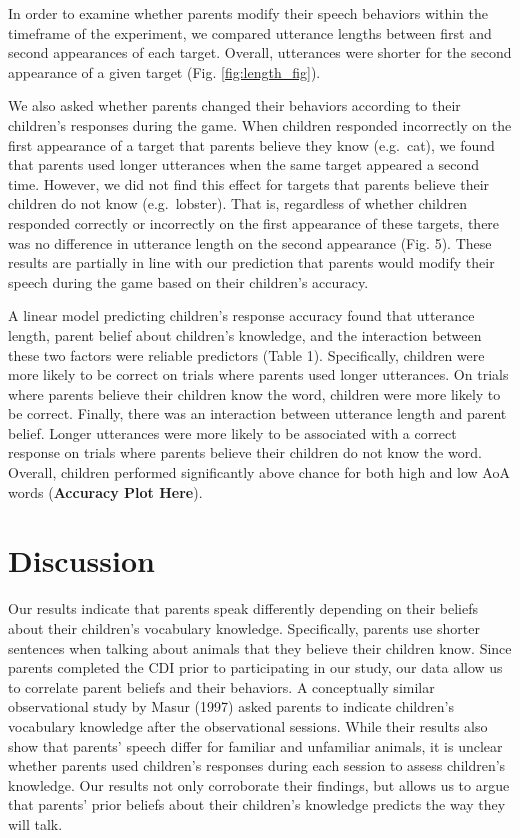 \documentclass[10pt, letterpaper]{article}
\begin{document}
In order to examine whether parents modify their speech behaviors within
the timeframe of the experiment, we compared utterance lengths between
first and second appearances of each target. Overall, utterances were
shorter for the second appearance of a given target (Fig.
\ref{fig:length_fig}).

We also asked whether parents changed their behaviors according to their
children's responses during the game. When children responded
incorrectly on the first appearance of a target that parents believe
they know (e.g.~cat), we found that parents used longer utterances when
the same target appeared a second time. However, we did not find this
effect for targets that parents believe their children do not know
(e.g.~lobster). That is, regardless of whether children responded
correctly or incorrectly on the first appearance of these targets, there
was no difference in utterance length on the second appearance (Fig. 5).
These results are partially in line with our prediction that parents
would modify their speech during the game based on their children's
accuracy.

A linear model predicting children's response accuracy found that
utterance length, parent belief about children's knowledge, and the
interaction between these two factors were reliable predictors (Table
1). Specifically, children were more likely to be correct on trials
where parents used longer utterances. On trials where parents believe
their children know the word, children were more likely to be correct.
Finally, there was an interaction between utterance length and parent
belief. Longer utterances were more likely to be associated with a
correct response on trials where parents believe their children do not
know the word. Overall, children performed significantly above chance
for both high and low AoA words (\textbf{Accuracy Plot Here}).

\section{Discussion}\label{discussion}

Our results indicate that parents speak differently depending on their
beliefs about their children's vocabulary knowledge. Specifically,
parents use shorter sentences when talking about animals that they
believe their children know. Since parents completed the CDI prior to
participating in our study, our data allow us to correlate parent
beliefs and their behaviors. A conceptually similar observational study
by Masur (1997) asked parents to indicate children's vocabulary
knowledge after the observational sessions. While their results also
show that parents' speech differ for familiar and unfamiliar animals, it
is unclear whether parents used children's responses during each session
to assess children's knowledge. Our results not only corroborate their
findings, but allows us to argue that parents' prior beliefs about their
children's knowledge predicts the way they will talk.
\end{document}
